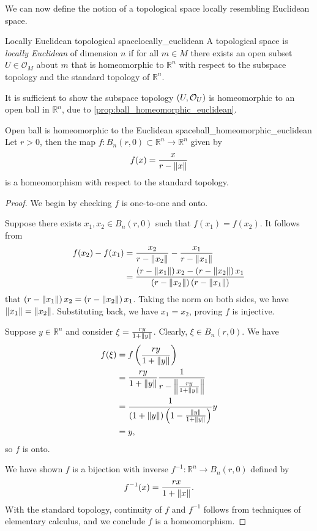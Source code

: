 We can now define the notion of a topological space locally resembling Euclidean space.
\begin{definition}{Locally Euclidean topological space}{locally_euclidean}
    A topological space  is \emph{locally Euclidean} of dimension \(n\) if for all \(m \in M\) there exists an open subset \(U \in \mathcal{O}_M\) about \(m\) that is homeomorphic to \(\mathbb{R}^n\) with respect to the subspace topology and the standard topology of \(\mathbb{R}^n\).
\end{definition}
It is sufficient to show the subspace topology \(\topology{U}\) is homeomorphic to an open ball in \(\mathbb{R}^n\), due to \cref{prop:ball_homeomorphic_euclidean}.
\begin{proposition}{Open ball is homeomorphic to the Euclidean space}{ball_homeomorphic_euclidean}
    Let \(r > 0\), then the map \(f : B_n(r, 0)\subset\mathbb{R}^n\to\mathbb{R}^n\) given by
    \[f(x) = \frac{x}{r - \norm{x}}\]
    is a homeomorphism with respect to the standard topology.
\end{proposition}
\begin{proof}
    We begin by checking \(f\) is one-to-one and onto.

    Suppose there exists \(x_1, x_2 \in B_n(r, 0)\) such that \(f(x_1) = f(x_2)\). It follows from
    \begin{align*}
        f(x_2) - f(x_1) &= \frac{x_2}{r - \norm{x_2}} - \frac{x_1}{r - \norm{x_1}}\\
                        &= \frac{\left(r - \norm{x_1}\right)x_2 - \left(r - \norm{x_2}\right)x_1}{\left(r - \norm{x_2}\right)\left(r - \norm{x_1}\right)}
    \end{align*}
    that \(\left(r - \norm{x_1}\right)x_2 = \left(r - \norm{x_2}\right)x_1\). Taking the norm on both sides, we have \(\norm{x_1} = \norm{x_2}\). Substituting back, we have \(x_1 = x_2\), proving \(f\) is injective.

    Suppose \(y \in \mathbb{R}^n\) and consider \(\xi = \frac{ry}{1 + \norm{y}}\). Clearly, \(\xi \in B_n(r,0)\). We have
    \begin{align*}
        f(\xi) &= f\left(\frac{ry}{1 + \norm{y}}\right)\\
               &= \frac{ry}{1 + \norm{y}} \frac{1}{r - \norm*{\frac{ry}{1 + \norm{y}}}}\\
               &= \frac{1}{\left(1 + \norm{y}\right)\left(1 - \frac{\norm{y}}{1 + \norm{y}}\right)} y\\
               &= y,
    \end{align*}
    so \(f\) is onto.

    We have shown \(f\) is a bijection with inverse \(f^{-1} : \mathbb{R}^n \to B_n(r, 0)\) defined by
    \begin{equation}
        f^{-1}(x) = \frac{rx}{1 + \norm{x}}.
    \end{equation}
    With the standard topology, continuity of \(f\) and \(f^{-1}\) follows from techniques of elementary calculus, and we conclude \(f\) is a homeomorphism.
\end{proof}
